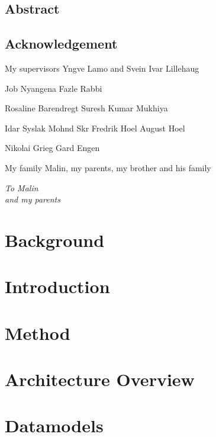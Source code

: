 \documentclass[a4paper,12pt]{book}
\begin{document}
\frontmatter


\newpage
\section*{Abstract}
\newpage
\section*{Acknowledgement}
My supervisors Yngve Lamo and Svein Ivar Lillehaug

Job Nyangena
Fazle Rabbi

Rosaline Barendregt
Suresh Kumar Mukhiya

Idar Syslak
Mohnd Skr
Fredrik Hoel
August Hoel

Nikolai Grieg
Gard Engen

My family Malin, my parents, my brother and his family
\newpage
\begin{flushright}
	\null{}
	\itshape
	To Malin \\
	and my parents
	\null
\end{flushright}

\tableofcontents
\mainmatter


\chapter{Background}


\chapter{Introduction}



\chapter{Method}


\chapter{Architecture Overview}


\chapter{Datamodels}
\end{document}
